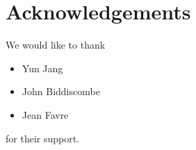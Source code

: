 \section{Acknowledgements}
\label{sec:acknowledgements}

We would like to thank

\begin{itemize}

\item
  Yun Jang
\item
  John Biddiscombe
\item
  Jean Favre

\end{itemize}

for their support.
